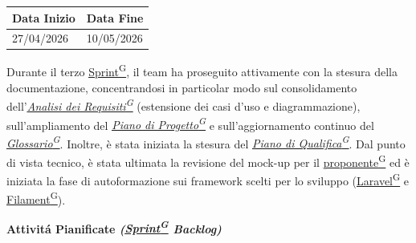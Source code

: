 \documentclass[a4paper,12pt]{article}
\newcounter{subsubsubsection}[subsubsection]
\providecommand{\glslink}[2]{\href{https://alittlebyte-19.github.io/Documentazione/glossario.html\#gls-#1}{\underline{#2}\textsuperscript{\scriptsize G}}}
\begin{document}
\label{sec:rtb_terzoperiodo}
\begin{table}[H]
    \centering
    \renewcommand{\arraystretch}{1.5} %
    \begin{tabularx}{\textwidth}{|X|X|}
    \hline \rowcolor{Dandelion!50}
    \textbf{Data Inizio} & \textbf{Data Fine}\\
    \hline
    27/04/2026 & 10/05/2026\\
    \hline

    \end{tabularx}
\end{table}

Durante il terzo \glslink{sprint}{Sprint}, il team ha proseguito attivamente con la stesura della documentazione, concentrandosi in particolar modo sul consolidamento dell'\textit{\glslink{analisi-dei-requisiti-adr}{Analisi dei Requisiti}} (estensione dei casi d'uso e diagrammazione), sull'ampliamento del \textit{\glslink{piano-di-progetto}{Piano di Progetto}} e sull'aggiornamento continuo del \textit{\glslink{glossario}{Glossario}}. Inoltre, è stata iniziata la stesura del \textit{\glslink{piano-di-qualifica}{Piano di Qualifica}}. Dal punto di vista tecnico, è stata ultimata la revisione del mock-up per il \glslink{committente-proponente}{proponente} ed è iniziata la fase di autoformazione sui framework scelti per lo sviluppo (\glslink{laravel}{Laravel} e \glslink{filament}{Filament}).

\begin{center}
\noindent\textbf{Attivitá Pianificate \textit{(\glslink{sprint}{Sprint} Backlog)}}\\
\end{center}
\end{document}
